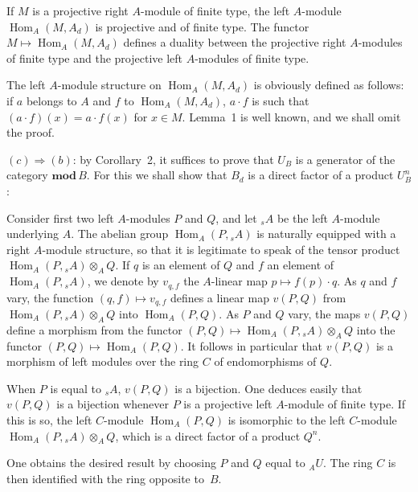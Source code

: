 \begin{lemma}
If $M$ is a projective right $A$-module of finite type, the left
$A$-module $\operatorname{Hom}_A(M,A_d)$ is projective and of finite
type.  The functor $M\mapsto\operatorname{Hom}_A(M,A_d)$ defines a
duality between the projective right $A$-modules of finite type and
the projective left $A$-modules of finite type.
\end{lemma}

The left $A$-module structure on
$\operatorname{Hom}_A(M,A_d)$ is obviously defined as follows: if $a$
belongs to $A$ and $f$ to $\operatorname{Hom}_A(M,A_d)$, $a\cdot f$ is
such that $(a\cdot f)(x)=a\cdot f(x)$ for $x\in M$.  Lemma~1 is well
known, and we shall omit the proof.

$(c)\Rightarrow(b)$: by Corollary~2, it suffices to prove that $U_B$ is
a generator of the category $\mathbf{mod}\,B$.  For this we shall show
that $B_d$ is a direct factor of a product $U_B^n$:

Consider first two left $A$-modules $P$ and $Q$, and let ${}_sA$ be
the left $A$-module underlying $A$.  The abelian group
$\operatorname{Hom}_A(P,{}_sA)$ is naturally equipped with a right
$A$-module structure, so that it is legitimate to speak of the tensor
product $\operatorname{Hom}_A(P,{}_sA)\otimes_A Q$.  If $q$ is an
element of $Q$ and $f$ an element of
$\operatorname{Hom}_A(P,{}_sA)$, we denote by $v_{q,f}$ the $A$-linear
map $p\mapsto f(p)\cdot q$.  As $q$ and $f$ vary, the function
$(q,f)\mapsto v_{q,f}$ defines a linear map $v(P,Q)$ from
$\operatorname{Hom}_A(P,{}_sA)\otimes_A Q$ into
$\operatorname{Hom}_A(P,Q)$.  As $P$ and $Q$ vary, the maps $v(P,Q)$
define a morphism from the functor
$(P,Q)\mapsto\operatorname{Hom}_A(P,{}_sA)\otimes_A Q$ into the
functor $(P,Q)\mapsto\operatorname{Hom}_A(P,Q)$.  It follows in
particular that $v(P,Q)$ is a morphism of left modules over the ring
$C$ of endomorphisms of $Q$.

When $P$ is equal to ${}_sA$, $v(P,Q)$ is a bijection.  One deduces
easily that $v(P,Q)$ is a bijection whenever $P$ is a projective left
$A$-module of finite type.  If this is so, the left $C$-module
$\operatorname{Hom}_A(P,Q)$ is isomorphic to the left $C$-module
$\operatorname{Hom}_A(P,{}_sA)\otimes_A Q$, which is a direct factor of
a product $Q^n$.

One obtains the desired result by choosing $P$ and $Q$ equal to
${}_AU$.  The ring $C$ is then identified with the ring opposite
to~$B$.

